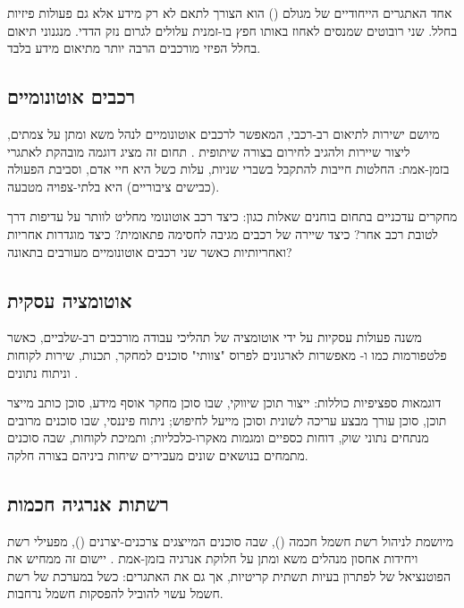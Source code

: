 \documentclass[12pt,a4paper]{article}
\begin{document}
אחד האתגרים הייחודיים של  מגולם () הוא הצורך לתאם לא רק מידע אלא גם פעולות פיזיות בחלל. שני רובוטים שמנסים לאחוז באותו חפץ בו-זמנית עלולים לגרום נזק הדדי. מנגנוני תיאום בחלל הפיזי מורכבים הרבה יותר מתיאום מידע בלבד.

\subsection{רכבים אוטונומיים}

 מיושם ישירות לתיאום רב-רכבי, המאפשר לרכבים אוטונומיים לנהל משא ומתן על צמתים, ליצור שיירות ולהגיב לחירום בצורה שיתופית \cite{ScienceDirect_MARL2024}. תחום זה מציג דוגמה מובהקת לאתגרי  בזמן-אמת: החלטות חייבות להתקבל בשברי שניות, עלות כשל היא חיי אדם, וסביבת הפעולה (כבישים ציבוריים) היא בלתי-צפויה מטבעה.

מחקרים עדכניים בתחום בוחנים שאלות כגון: כיצד רכב אוטונומי מחליט לוותר על עדיפות דרך לטובת רכב אחר? כיצד שיירה של רכבים מגיבה לחסימה פתאומית? כיצד מוגדרות אחריות ואחריותיות כאשר שני רכבים אוטונומיים מעורבים בתאונה?

\subsection{אוטומציה עסקית}

 משנה פעולות עסקיות על ידי אוטומציה של תהליכי עבודה מורכבים רב-שלביים, כאשר פלטפורמות כמו  ו- מאפשרות לארגונים לפרוס "צוותי" סוכנים למחקר, תכנות, שירות לקוחות וניתוח נתונים \cite{Cognizant2025}.

דוגמאות ספציפיות כוללות: ייצור תוכן שיווקי, שבו סוכן מחקר אוסף מידע, סוכן כותב מייצר תוכן, סוכן עורך מבצע עריכה לשונית וסוכן  מייעל לחיפוש; ניתוח פיננסי, שבו סוכנים מרובים מנתחים נתוני שוק, דוחות כספיים ומגמות מאקרו-כלכליות; ותמיכת לקוחות, שבה סוכנים מתמחים בנושאים שונים מעבירים שיחות ביניהם בצורה חלקה.

\subsection{רשתות אנרגיה חכמות}

 מיושמת לניהול רשת חשמל חכמה (), שבה סוכנים המייצגים צרכנים-יצרנים (), מפעילי רשת ויחידות אחסון מנהלים משא ומתן על חלוקת אנרגיה בזמן-אמת \cite{ScienceDirect_AgentAI2025}. יישום זה ממחיש את הפוטנציאל של  לפתרון בעיות תשתית קריטיות, אך גם את האתגרים: כשל במערכת  של רשת חשמל עשוי להוביל להפסקות חשמל נרחבות.
\end{document}
